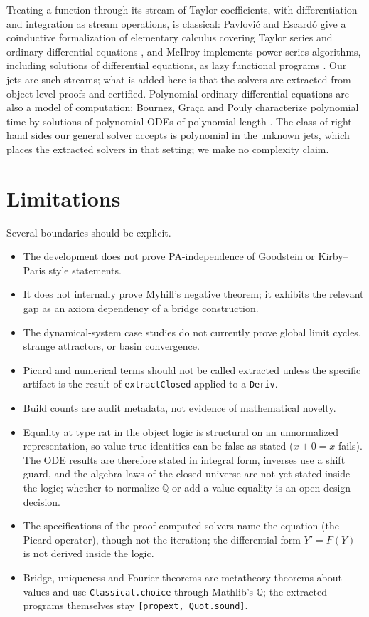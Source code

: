 \documentclass[11pt,a4paper]{article}
\theoremstyle{definition}
\theoremstyle{remark}
\newcommand{\lean}[1]{\texttt{\nolinkurl{#1}}}
\begin{document}
Treating a function through its stream of Taylor coefficients, with
differentiation and integration as stream operations, is classical:
Pavlovi\'c and Escard\'o give a coinductive formalization of elementary
calculus covering Taylor series and ordinary differential equations
\cite{pavlovic1998}, and McIlroy implements power-series algorithms, including
solutions of differential equations, as lazy functional programs
\cite{mcilroy1999}. Our jets are such streams; what is added here is that the
solvers are extracted from object-level proofs and certified. Polynomial
ordinary differential equations are also a model of computation: Bournez,
Gra\c{c}a and Pouly characterize polynomial time by solutions of polynomial
ODEs of polynomial length \cite{bournez2017}. The class of right-hand sides our
general solver accepts is polynomial in the unknown jets, which places the
extracted solvers in that setting; we make no complexity claim.

\section{Limitations}

Several boundaries should be explicit.

\begin{itemize}
\item The development does not prove PA-independence of Goodstein or
Kirby--Paris style statements.
\item It does not internally prove Myhill's negative theorem; it exhibits the
relevant gap as an axiom dependency of a bridge construction.
\item The dynamical-system case studies do not currently prove global limit
cycles, strange attractors, or basin convergence.
\item Picard and numerical terms should not be called extracted unless the
specific artifact is the result of \lean{extractClosed} applied to a
\lean{Deriv}.
\item Build counts are audit metadata, not evidence of mathematical novelty.
\item Equality at type \(\mathrm{rat}\) in the object logic is structural on an
unnormalized representation, so value-true identities can be false as stated
(\(x + 0 = x\) fails). The ODE results are therefore stated in integral form,
inverses use a shift guard, and the algebra laws of the closed universe are not
yet stated inside the logic; whether to normalize \(\mathbb{Q}\) or add a value
equality is an open design decision.
\item The specifications of the proof-computed solvers name the equation (the
Picard operator), though not the iteration; the differential form
\(Y' = F(Y)\) is not derived inside the logic.
\item Bridge, uniqueness and Fourier theorems are metatheory theorems about
values and use \lean{Classical.choice} through Mathlib's \(\mathbb{Q}\); the
extracted programs themselves stay \lean{[propext, Quot.sound]}.
\end{itemize}
\end{document}
